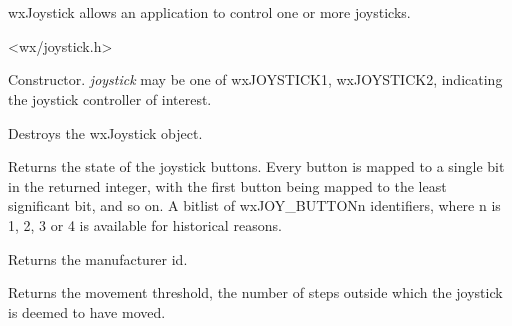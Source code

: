 \section{}\label{wxjoystick}

wxJoystick allows an application to control one or more joysticks.




<wx/joystick.h>




\label{wxjoystickconstr}


Constructor. {\it joystick} may be one of wxJOYSTICK1, wxJOYSTICK2, indicating the joystick
controller of interest.



Destroys the wxJoystick object.

\label{wxjoystickgetbuttonstate}


Returns the state of the joystick buttons. Every button is mapped to a single
bit in the returned integer, with the first button being mapped to the least
significant bit, and so on.
A bitlist of wxJOY\_BUTTONn identifiers, where n is 1, 2, 3 or 4 
is available for historical reasons.

\label{wxjoystickgetmanufacturerid}


Returns the manufacturer id.

\label{wxjoystickgetmovementthreshold}


Returns the movement threshold, the number of steps outside which the joystick is deemed to have
moved.

